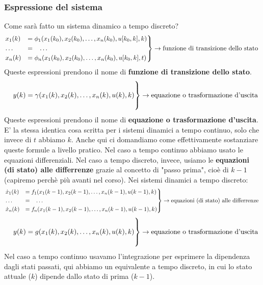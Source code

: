 \subsubsection{Espressione del sistema}
Come sarà fatto un sistema dinamico a tempo discreto?
\[
    \begin{rcases}
        x_1(k) &= \phi_1(x_1(k_0),x_2(k_0), \dots, x_n(k_0), u[k_0,k], k)\\
        \dots \;\;\;&= \;\;\;\dots\\
        x_n(k) &= \phi_n(x_1(k_0),x_2(k_0), \dots, x_n(k_0), u[k_0,k], t)
    \end{rcases} \rightarrow \text{funzione di transizione dello stato}\;
\]
Queste espressioni prendono il nome di \textbf{funzione di transizione dello stato}.\newline
\[
    \begin{rcases}
        \\
        \;\;\;\; y(k) = \gamma(x_1(k),x_2(k), \dots, x_n(k), u(k), k)\\
        \\
    \end{rcases} \rightarrow \text{equazione o trasformazione d'uscita}\;
\]
Queste espressioni prendono il nome di \textbf{equazione o trasformazione d'uscita}.\newline
\newline
E' la stessa identica cosa scritta per i sistemi dinamici a tempo continuo, solo che invece di $t$ abbiamo $k$.\newline
\newline
Anche qui ci domandiamo come effettivamente sostanziare queste formule a livello pratico. Nel caso a tempo continuo abbiamo usato le equazioni differenziali. Nel caso a tempo discreto, invece, usiamo le \textbf{equazioni (di stato) alle differrenze} grazie al concetto di "passo prima", cioè di $k-1$ (capiremo perchè più avanti nel corso).\newline
\newline
Nei sistemi dinamici a tempo discreto: 
\[
    \begin{rcases}
        \dot{x}_1(k) &= f_1(x_1(k-1),x_2(k-1), \dots, x_n(k-1), u(k-1), k)\\
        \dots \;\;\;&= \;\;\;\dots\\
        \dot{x}_n(k) &= f_n(x_1(k-1),x_2(k-1), \dots, x_n(k-1), u(k-1), k)
    \end{rcases} \rightarrow \text{equazioni (di stato) alle differrenze}\;
\]
\[
    \begin{rcases}
        \\
        \;\;\;\; y(k) = g(x_1(k),x_2(k), \dots, x_n(k), u(k), k)\\
        \\
    \end{rcases} \rightarrow \text{equazione o trasformazione d'uscita}\;
\]
Nel caso a tempo continuo usavamo l'integrazione per esprimere la dipendenza dagli stati passati, qui abbiamo un equivalente a tempo discreto, in cui lo stato attuale ($k$) dipende dallo stato di prima ($k-1$).
